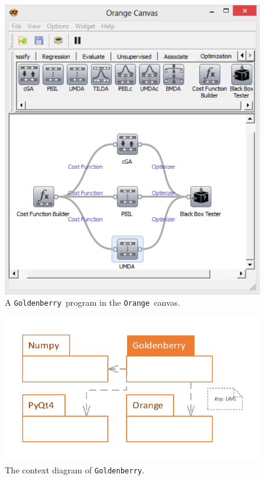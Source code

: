 \documentclass{sig-alternate}
\newcommand{\Orange}{\texttt{Orange}}
\newcommand{\GB}{\texttt{Goldenberry}}
\begin{document}
\begin{figure}[h]
	\centering
	\includegraphics[width=1.0\columnwidth,height=.4\textheight]{canvas} 
	\caption{{\small A \GB~program in the \Orange~canvas.}}
	\label{fig:canvas}
\end{figure}

\begin{figure}[h]
	\centering
	\includegraphics[scale=.75]{context} 
	\caption{The context diagram of \GB.}
	\label{fig:context}
\end{figure}
\end{document}
